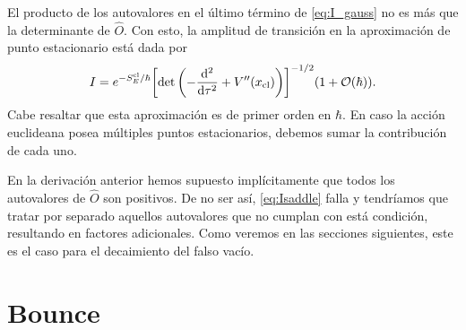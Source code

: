 El producto de los autovalores en el último término de \eqref{eq:I_gauss} no es más que la determinante de $\hat{O}$. Con esto, %
la amplitud de transición en la aproximación de punto estacionario está dada por
\begin{equation}\label{eq:Isaddle}
I = e^{-S_E^{\textrm{cl}} / \hbar} \qty[ \det\left(-\dv[2]{\tau} + V''\qty(x_{\textrm{cl}}) \right) ]^{-1/2} \qty(1 + \order{\hbar}).
\end{equation}
Cabe resaltar que esta aproximación es de primer orden en $\hbar$. En caso la acción euclideana posea múltiples puntos estacionarios, debemos sumar la contribución de cada uno.


En la derivación anterior hemos supuesto implícitamente que todos los autovalores de $\hat{O}$ son positivos. De no ser así, \eqref{eq:Isaddle} falla y tendríamos que tratar por separado aquellos autovalores que no cumplan con está condición, resultando en factores adicionales. %
Como veremos en las secciones siguientes, este es el caso para el decaimiento del falso vacío.

\section{Bounce}


 


